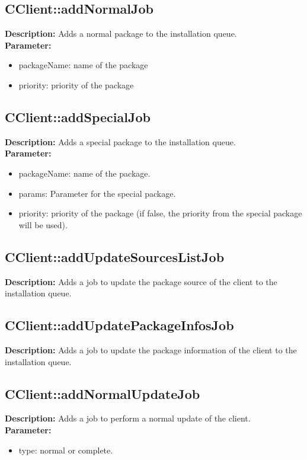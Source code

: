 \subsection{CClient::addNormalJob}
\textbf{Description:} Adds a normal package to the installation queue.\\
\textbf{Parameter:}
\begin{itemize}
\item packageName: name of the package
\item priority: priority of the package
\end{itemize}

\subsection{CClient::addSpecialJob}
\textbf{Description:} Adds a special package to the installation queue.\\
\textbf{Parameter:}
\begin{itemize}
\item packageName: name of the package.
\item params: Parameter for the special package.
\item priority: priority of the package (if false, the priority from the special package will be used).
\end{itemize}

\subsection{CClient::addUpdateSourcesListJob}
\textbf{Description:} Adds a job to update the package source of the client to the installation queue.\\

\subsection{CClient::addUpdatePackageInfosJob}
\textbf{Description:} Adds a job to update the package information of the client to the installation queue.\\

\subsection{CClient::addNormalUpdateJob}
\textbf{Description:} Adds a job to perform a normal update of the client.\\
\textbf{Parameter:}
\begin{itemize}
\item type: normal or complete.
\end{itemize}

